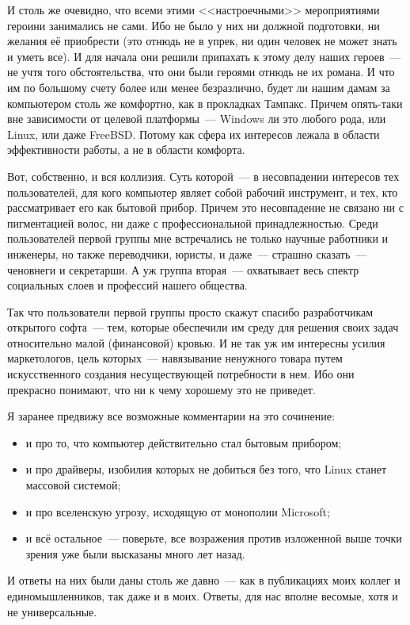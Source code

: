 И столь же очевидно, что всеми этими <<настроечными>> мероприятиями героини занимались не сами. Ибо не было у них ни должной подготовки, ни желания её приобрести (это отнюдь не в упрек, ни один человек не может знать и уметь все). И для начала они решили припахать к этому делу наших героев~--- не учтя того обстоятельства, что они были героями отнюдь не их романа. И что им по большому счету более или менее безразлично, будет ли нашим дамам за компьютером столь же комфортно, как в прокладках Тампакс. Причем опять-таки вне зависимости от целевой платформы~--- Windows ли это любого рода, или Linux, или даже FreeBSD. Потому как сфера их интересов лежала в области эффективности работы, а не в области комфорта. 

Вот, собственно, и вся коллизия. Суть которой~--- в несовпадении интересов тех пользователей, для кого компьютер являет собой рабочий инструмент, и тех, кто рассматривает его как бытовой прибор. Причем это несовпадение не связано ни с пигментацией волос, ни даже с профессиональной принадлежностью. Среди пользователей первой группы мне встречались не только научные работники и инженеры, но также переводчики, юристы, и даже~--- страшно сказать~--- ченовнеги и секретарши. А уж группа вторая~--- охватывает весь спектр социальных слоев и профессий нашего общества. 

Так что пользователи первой группы просто скажут спасибо разработчикам открытого софта~--- тем, которые обеспечили им среду для решения своих задач относительно малой (финансовой) кровью. И не так уж им интересны усилия маркетологов, цель которых~--- навязывание ненужного товара путем искусственного создания несуществующей потребности в нем. Ибо они прекрасно понимают, что ни к чему хорошему это не приведет. 

Я заранее предвижу все возможные комментарии на это сочинение: 

\begin{itemize}
	\item и про то, что компьютер действительно стал бытовым прибором; 
	\item и про драйверы, изобилия которых не добиться без того, что Linux станет массовой системой;
	\item и про вселенскую угрозу, исходящую от монополии Microsoft; 
	\item и всё остальное~--- поверьте, все возражения против изложенной выше точки зрения уже были высказаны много лет назад. 
\end{itemize}

И ответы на них были даны столь же давно~--- как в публикациях моих коллег и единомышленников, так даже и в моих. Ответы, для нас вполне весомые, хотя и не универсальные. 

